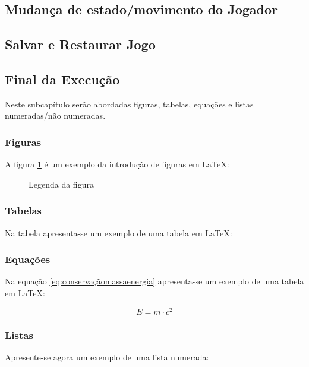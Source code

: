 \documentclass[a4paper,11pt]{article}
\newcommand\tab[1][0.8cm]{\hspace*{#1}}
\begin{document}
\subsection{Mudança de estado/movimento do Jogador}
\pagebreak

\subsection{Salvar e Restaurar Jogo}
\pagebreak

\subsection{Final da Execução}
\pagebreak

\tab Neste subcapítulo serão abordadas figuras, tabelas, equações e listas numeradas/não numeradas.

\subsubsection{Figuras}

\tab A figura \ref{fig:exemplo} é um exemplo da introdução de figuras em \LaTeX:

\begin{figure}[!ht]
    \centering
    \caption{Legenda da figura}
    \label{fig:exemplo}
\end{figure}


\subsubsection{Tabelas}

\tab Na tabela apresenta-se um exemplo de uma tabela em \LaTeX:

\subsubsection{Equações}

\tab Na equação \ref{eq:conservaçãomassaenergia} apresenta-se um exemplo de uma tabela em \LaTeX:

\begin{equation}\label{eq:conservaçãomassaenergia}
    E = m \cdot c^{2}
\end{equation}

\subsubsection{Listas}

\tab Apresente-se agora um exemplo de uma lista numerada:
\end{document}
